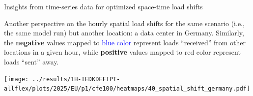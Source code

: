 \begin{frame}{Insights from time-series data for optimized space-time load shifts}
\label{ssec:time-series}

  {\footnotesize

  Another perspective on the \alert{hourly spatial load shifts} for the same scenario (i.e., the same model run) but another location: a data center in Germany. Similarly, the {\bf negative} values mapped to \textcolor{blue}{blue color} represent loads \enquote{received} from other locations in a given hour, while {\bf positive} values mapped to \textcolor{TUred}{red color} represent loads \enquote{sent} away. 

  \vspace{0.1cm}
  \texttt{[image: ../results/1H-IEDKDEFIPT-allflex/plots/2025/EU/p1/cfe100/heatmaps/40\_spatial\_shift\_germany.pdf]}
  }
  
\end{frame}


